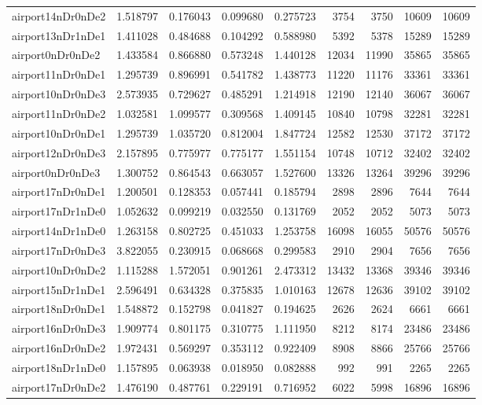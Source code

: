 \begin{longtable}{|l|r|r|r|r|r|r|r|r|}
airport14nDr0nDe2 & 1.518797 & 0.176043 & 0.099680 & 0.275723 & 3754 & 3750 & 10609 & 10609 \\
airport13nDr1nDe1 & 1.411028 & 0.484688 & 0.104292 & 0.588980 & 5392 & 5378 & 15289 & 15289 \\
airport0nDr0nDe2 & 1.433584 & 0.866880 & 0.573248 & 1.440128 & 12034 & 11990 & 35865 & 35865 \\
airport11nDr0nDe1 & 1.295739 & 0.896991 & 0.541782 & 1.438773 & 11220 & 11176 & 33361 & 33361 \\
airport10nDr0nDe3 & 2.573935 & 0.729627 & 0.485291 & 1.214918 & 12190 & 12140 & 36067 & 36067 \\
airport11nDr0nDe2 & 1.032581 & 1.099577 & 0.309568 & 1.409145 & 10840 & 10798 & 32281 & 32281 \\
airport10nDr0nDe1 & 1.295739 & 1.035720 & 0.812004 & 1.847724 & 12582 & 12530 & 37172 & 37172 \\
airport12nDr0nDe3 & 2.157895 & 0.775977 & 0.775177 & 1.551154 & 10748 & 10712 & 32402 & 32402 \\
airport0nDr0nDe3 & 1.300752 & 0.864543 & 0.663057 & 1.527600 & 13326 & 13264 & 39296 & 39296 \\
airport17nDr0nDe1 & 1.200501 & 0.128353 & 0.057441 & 0.185794 & 2898 & 2896 & 7644 & 7644 \\
airport17nDr1nDe0 & 1.052632 & 0.099219 & 0.032550 & 0.131769 & 2052 & 2052 & 5073 & 5073 \\
airport14nDr1nDe0 & 1.263158 & 0.802725 & 0.451033 & 1.253758 & 16098 & 16055 & 50576 & 50576 \\
airport17nDr0nDe3 & 3.822055 & 0.230915 & 0.068668 & 0.299583 & 2910 & 2904 & 7656 & 7656 \\
airport10nDr0nDe2 & 1.115288 & 1.572051 & 0.901261 & 2.473312 & 13432 & 13368 & 39346 & 39346 \\
airport15nDr1nDe1 & 2.596491 & 0.634328 & 0.375835 & 1.010163 & 12678 & 12636 & 39102 & 39102 \\
airport18nDr0nDe1 & 1.548872 & 0.152798 & 0.041827 & 0.194625 & 2626 & 2624 & 6661 & 6661 \\
airport16nDr0nDe3 & 1.909774 & 0.801175 & 0.310775 & 1.111950 & 8212 & 8174 & 23486 & 23486 \\
airport16nDr0nDe2 & 1.972431 & 0.569297 & 0.353112 & 0.922409 & 8908 & 8866 & 25766 & 25766 \\
airport18nDr1nDe0 & 1.157895 & 0.063938 & 0.018950 & 0.082888 & 992 & 991 & 2265 & 2265 \\
airport17nDr0nDe2 & 1.476190 & 0.487761 & 0.229191 & 0.716952 & 6022 & 5998 & 16896 & 16896 \\

\end{longtable}
